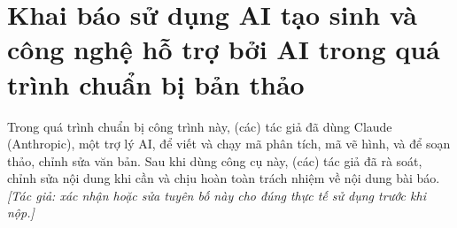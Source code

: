 \documentclass[a4paper,preprint,12pt,authoryear]{elsarticle}
\begin{document}
\section*{Khai báo sử dụng AI tạo sinh và công nghệ hỗ trợ bởi AI trong quá trình chuẩn bị bản thảo}
Trong quá trình chuẩn bị công trình này, (các) tác giả đã dùng Claude (Anthropic), một trợ lý AI, để viết và chạy mã phân tích, mã vẽ hình, và để soạn thảo, chỉnh sửa văn bản. Sau khi dùng công cụ này, (các) tác giả đã rà soát, chỉnh sửa nội dung khi cần và chịu hoàn toàn trách nhiệm về nội dung bài báo. \emph{[Tác giả: xác nhận hoặc sửa tuyên bố này cho đúng thực tế sử dụng trước khi nộp.]}

\end{document}
